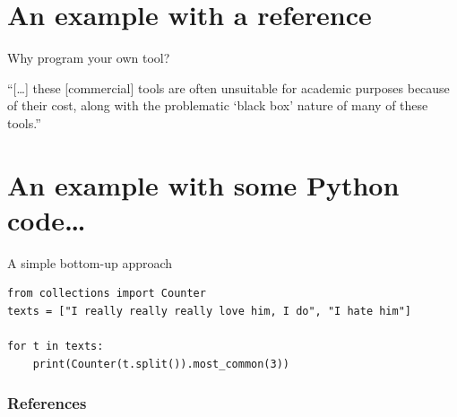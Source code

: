 \documentclass[handout]{beamer}
\begin{document}

\section{An example with a reference}
\begin{frame}{Why program your own tool?}
	\begin{block}{\textcite{Vis2013}}
		``{[}\ldots{]} these {[}commercial{]} tools are often unsuitable for academic purposes because of their cost, along with the problematic `black box' nature of many of these tools.''
	\end{block}
\end{frame}



\section{An example with some Python code\dots}

\begin{frame}[fragile]{A simple bottom-up approach}
\begin{lstlisting}
from collections import Counter
texts = ["I really really really love him, I do", "I hate him"]

for t in texts:
    print(Counter(t.split()).most_common(3))
\end{lstlisting}

\begin{lstlistingoutput}
\end{lstlistingoutput}
\end{frame}



\begin{frame}
	\frametitle{References}
	\printbibliography
\end{frame}
	
\end{document}
